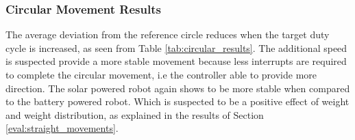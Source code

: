 \begin{table}[t]
	\centering
	\caption{The Euclidean distance between the measurements and the best fitting circle.}
	\label{tab:circular_results}
\end{table}

\subsubsection{Circular Movement Results}
The average deviation from the reference circle reduces when the target duty cycle is increased, as seen from Table \ref{tab:circular_results}.
The additional speed is suspected provide a more stable movement because less interrupts are required to complete the circular movement, i.e the controller able to provide more direction.
The solar powered robot again shows to be more stable when compared to the battery powered robot.
Which is suspected to be a positive effect of weight and weight distribution, as explained in the results of Section \ref{eval:straight_movements}.
